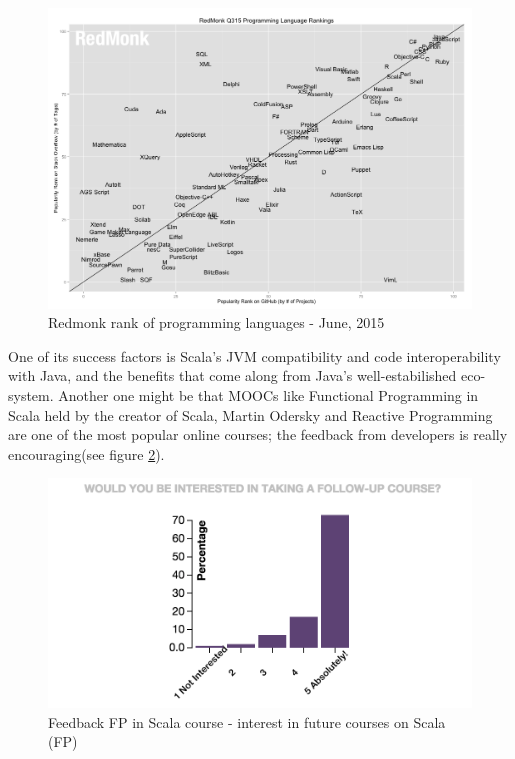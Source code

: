 \documentclass{article}
\begin{document}
\begin{figure}[h!]
  \includegraphics[width=\linewidth]{redmonk-rank.png}
  \caption{Redmonk rank of programming languages - June, 2015}
  \label{fig:redmonk-rank}
\end{figure}


One of its success factors is  Scala's JVM compatibility and code interoperability with Java, and the benefits that come along from  Java's well-estabilished eco-system. Another one might be that MOOCs  like Functional Programming in Scala \cite{scalastat:1} held  by the creator of Scala, Martin Odersky and Reactive Programming are one of the most popular online courses; the feedback from developers is really encouraging(see figure \ref{fig:interest}). \par

\begin{figure}[h!]
  \includegraphics[width=\linewidth]{interest.png}
  \caption{Feedback FP in Scala course - interest in future courses on Scala (FP)}
  \label{fig:interest}
\end{figure}
\end{document}
